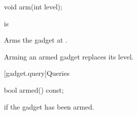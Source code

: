 %
\begin{itemdecl}
void arm(int level);
\end{itemdecl}

\begin{itemdescr}
\pnum
\expects
{} is 

\pnum
\effects
Arms the gadget at .

\begin{addedblock}
\pnum
Arming an armed gadget replaces its level.
\end{addedblock}
\end{itemdescr}

\begin{addedblock}
[gadget.query]{Queries}

%
\begin{itemdecl}
bool armed() const;
\end{itemdecl}

\begin{itemdescr}
\pnum
\returns
{} if the gadget has been armed.
\end{itemdescr}
\end{addedblock}
